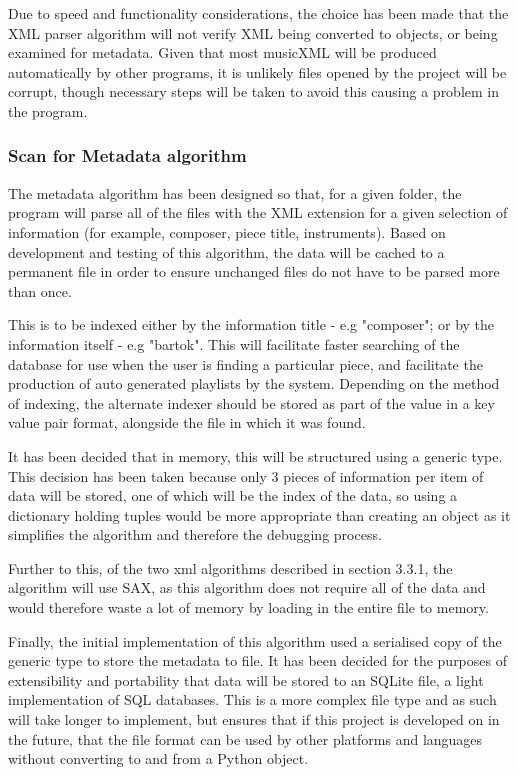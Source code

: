 Due to speed and functionality considerations, the choice has been made that the XML parser algorithm will not verify XML being converted to objects, or being examined for metadata. Given that most musicXML will be produced automatically by other programs, it is unlikely files opened by the project will be corrupt, though necessary steps will be taken to avoid this causing a problem in the program.

\subsubsection{Scan for Metadata algorithm}
The metadata algorithm has been designed so that, for a given folder, the program will parse all of the files with the XML extension for a given selection of information (for example, composer, piece title, instruments). Based on development and testing of this algorithm, the data will be cached to a permanent file in order to ensure unchanged files do not have to be parsed more than once.

This is to be indexed either by the information title - e.g "composer"; or by the information itself - e.g "bartok". This will facilitate faster searching of the database for use when the user is finding a particular piece, and facilitate the production of auto generated playlists by the system. Depending on the method of indexing, the alternate indexer should be stored as part of the value in a key value pair format, alongside the file in which it was found.

It has been decided that in memory, this will be structured using a generic type. This decision has been taken because only 3 pieces of information per item of data will be stored, one of which will be the index of the data, so using a dictionary holding tuples would be more appropriate than creating an object as it simplifies the algorithm and therefore the debugging process.

Further to this, of the two xml algorithms described in section 3.3.1, the algorithm will use SAX, as this algorithm does not require all of the data and would therefore waste a lot of memory by loading in the entire file to memory.

Finally, the initial implementation of this algorithm used a serialised copy of the generic type to store the metadata to file. It has been decided for the purposes of extensibility and portability that data will be stored to an SQLite file, a light implementation of SQL databases. This is a more complex file type and as such will take longer to implement, but ensures that if this project is developed on in the future, that the file format can be used by other platforms and languages without converting to and from a Python object.

